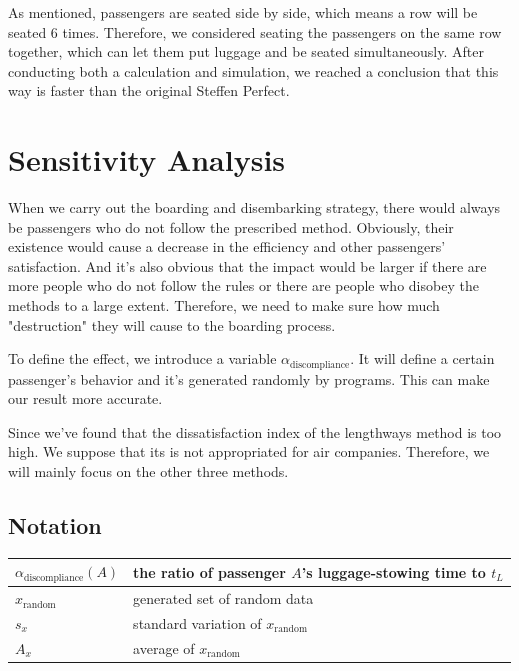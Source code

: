 \documentclass{article}
\theoremstyle{definition}
\theoremstyle{remark}
\numberwithin{equation}{section}
\begin{document}
	As mentioned, passengers are seated side by side, which means a row will be seated 6 times. Therefore, we considered seating the passengers on the same row together, which can let them put luggage and be seated simultaneously. After conducting both a calculation and simulation, we reached a conclusion that this way is faster than the original Steffen Perfect.
	\section{Sensitivity Analysis}
	When we carry out the boarding and disembarking strategy, there would always be passengers who do not follow the prescribed method. Obviously, their existence would cause a decrease in the efficiency and other passengers' satisfaction. And it's also obvious that the impact would be larger if there are more people who do not follow the rules or there are people who disobey the methods to a large extent. Therefore, we need to make sure how much "destruction" they will cause to the boarding process.

	To define the effect, we introduce a variable $\alpha_\text{discompliance}$. It will define a certain passenger's behavior and it's generated randomly by programs. This can make our result more accurate.

	Since we've found that the dissatisfaction index of the lengthways method is too high. We  suppose that its is not appropriated for air companies. Therefore, we will mainly focus on the other three methods.
	\subsection{Notation}
	\begin{center}
	\begin{tabular}{|l|l|}
		\hline
		$\alpha_\text{discompliance}(A)$ & the ratio of passenger \(A\)'s luggage-stowing time to \(t_L\) \\
		\hline
		\(x_{\mathrm{random}}\) & generated set of random data \\
		\hline
		\(s_x\) & standard variation of \(x_{\mathrm{random}}\) \\
		\hline
		\(A_x\) & average of \(x_{\mathrm{random}}\) \\
		\hline
	\end{tabular}
	\end{center}
\end{document}
